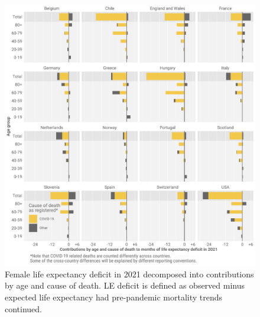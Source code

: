 \documentclass[12pt]{article}
\begin{document}
\begin{figure}[ht!]
    \centering
    \includegraphics{53-e0diffcodF.pdf}
    \caption{Female life expectancy deficit in 2021 decomposed into contributions by age and cause of death. LE deficit is defined as observed minus expected life expectancy had pre-pandemic mortality trends continued.}
    \label{fig:e0diffcodF}
\end{figure}
\end{document}
